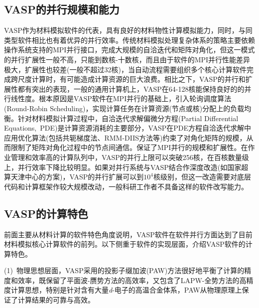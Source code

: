 \subsection{\rm{VASP}的并行规模和能力}
\textrm{VASP}作为材料模拟软件的代表，具有良好的材料物性计算模拟能力，同时，与同类型软件相比也有着优异的并行效率。传统材料模拟处理复杂体系的策略主要依赖操作系统支持的\textrm{MPI}并行接口，完成大规模的自洽迭代和矩阵对角化，但这一模式的并行扩展性一般不高，只能到数核-十数核，而且由于软件的\textrm{MPI}并行性能差异极大，扩展性也较差(一般不超过32核)，当自动流程需要组织多个核心计算软件完成跨尺度计算时，有可能造成计算资源的巨大浪费。相比之下，\textrm{VASP}的并行和扩展性都有突出的表现，一般的通用计算机上，\textrm{VASP}在64-128核能保持良好的的并行线性度。根本原因是\textrm{VASP}软件在\textrm{MPI}并行的基础上，引入轮询调度算法\textrm{(Round-Robin Scheduling)}，实现计算任务在计算资源(节点或核)分配上的负载均衡。针对材料模拟计算过程中，自洽迭代求解偏微分方程\textrm{(Partial Differential Equations,~PDE)}是计算资源消耗的主要部分，\textrm{VASP}在\textrm{PDE}方程自洽迭代求解中应用优化算法(包括共轭梯度法、\textrm{RMM-DIIS}方法等)约束了对角化矩阵的规模，从而限制了矩阵对角化过程中的节点间通信。保证了\textrm{MPI}并行的规模和扩展性。在作业管理和效率高的计算队列中，\textrm{VASP}的并行上限可以突破256核，在百核数量级上，并行效率下降比较明显。如果对并行系统与\textrm{VASP}结合作深度改造(如国家超算天津中心的方案)，\textrm{VASP}的并行扩展可以到$10^4$核级别，但这一改造需要对底层代码和计算框架作较大规模改动，一般科研工作者不具备这样的软件改写能力。

\subsection{\rm{VASP}的计算特色}
前面主要从材料计算的软件特色角度说明，\textrm{VASP}软件在软件并行方面达到了目前材料模拟核心计算软件的前列。以下侧重于软件的实现层面，介绍\textrm{VASP}软件的计算特色。

(1)~物理思想层面，\textrm{VASP}采用的投影子缀加波\textrm{(PAW)}方法很好地平衡了计算的精度和效率，既保留了平面波-赝势方法的高效率，又包含了\textrm{LAPW}-全势方法的高精度计算思想，特别是针对含有大量\textit{d}-电子的高温合金体系，\textrm{PAW}从物理原理上保证了计算结果的可靠与高效。

